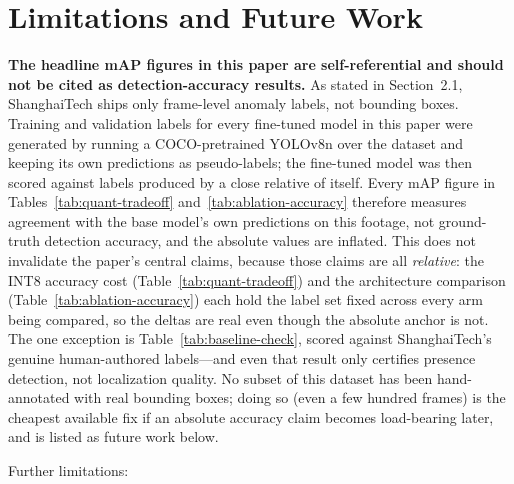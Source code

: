 \documentclass[11pt]{article}
\begin{document}
\section{Limitations and Future Work}
\label{sec:limitations}

\textbf{The headline mAP figures in this paper are self-referential and
should not be cited as detection-accuracy results.} As stated in
Section~2.1, ShanghaiTech ships only frame-level anomaly labels, not
bounding boxes. Training and validation labels for every fine-tuned model in
this paper were generated by running a COCO-pretrained YOLOv8n over the
dataset and keeping its own predictions as pseudo-labels; the fine-tuned
model was then scored against labels produced by a close relative of itself.
Every mAP figure in Tables~\ref{tab:quant-tradeoff}
and~\ref{tab:ablation-accuracy} therefore measures agreement with the base
model's own predictions on this footage, not ground-truth detection
accuracy, and the absolute values are inflated. This does not invalidate the
paper's central claims, because those claims are all \emph{relative}: the
INT8 accuracy cost (Table~\ref{tab:quant-tradeoff}) and the architecture
comparison (Table~\ref{tab:ablation-accuracy}) each hold the label set fixed
across every arm being compared, so the deltas are real even though the
absolute anchor is not. The one exception is
Table~\ref{tab:baseline-check}, scored against ShanghaiTech's genuine
human-authored labels---and even that result only certifies presence
detection, not localization quality. No subset of this dataset has been
hand-annotated with real bounding boxes; doing so (even a few hundred
frames) is the cheapest available fix if an absolute accuracy claim becomes
load-bearing later, and is listed as future work below.

Further limitations:
\end{document}
